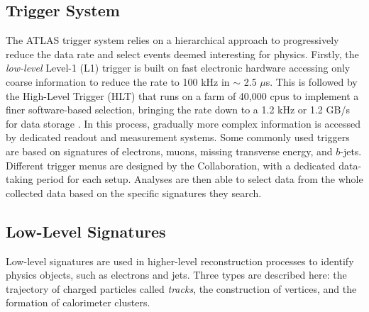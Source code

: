 \subsection{Trigger System}\label{sub-sec-trigger}
The ATLAS trigger system relies on a hierarchical approach to progressively reduce the data rate and select events deemed interesting for physics. Firstly, the \textit{low-level} Level-1 (L1) trigger is built on fast electronic hardware accessing only coarse information to reduce the rate to 100 kHz in $\sim$ 2.5 $\mu$s. This is followed by the High-Level Trigger (HLT) that runs on a farm of 40,000 \glspl{cpu} to implement a finer software-based selection, bringing the rate down to a 1.2 kHz or 1.2 GB/s for data storage \cite{TriggerATLAScollaboration_2020}. In this process, gradually more complex information is accessed by dedicated readout and measurement systems. Some commonly used triggers are based on signatures of electrons, muons, missing transverse energy, and $b$-jets. Different trigger menus are designed by the Collaboration, with a dedicated data-taking period for each setup. Analyses are then able to select data from the whole collected data based on the specific signatures they search. 

\subsection{Low-Level Signatures}
Low-level signatures are used in higher-level reconstruction processes to identify physics objects, such as electrons and jets. Three types are described here: the trajectory of charged particles called \textit{tracks}, the construction of vertices, and the formation of calorimeter clusters. \\

